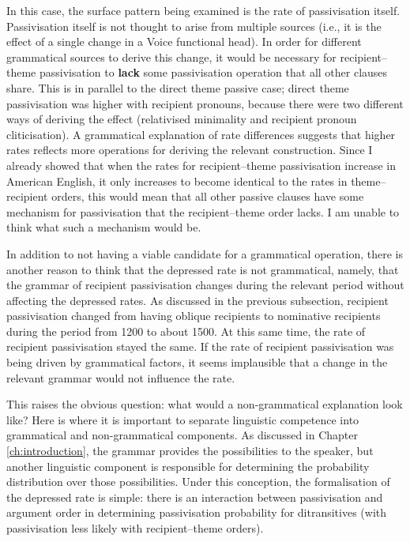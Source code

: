 	In this case, the surface pattern being examined is the rate of passivisation itself. Passivisation itself is not thought to arise from multiple sources (i.e., it is the effect of a single change in a Voice functional head). In order for different grammatical sources to derive this change, it would be necessary for recipient--theme passivisation to \textbf{lack} some passivisation operation that all other clauses share. This is in parallel to the direct theme passive case; direct theme passivisation was higher with recipient pronouns, because there were two different ways of deriving the effect (relativised minimality and recipient pronoun cliticisation). A grammatical explanation of rate differences suggests that higher rates reflects more operations for deriving the relevant construction. Since I already showed that when the rates for recipient--theme passivisation increase in American English, it only increases to become identical to the rates in theme--recipient orders, this would mean that all other passive clauses have some mechanism for passivisation that the recipient--theme order lacks. I am unable to think what such a mechanism would be.

	In addition to not having a viable candidate for a grammatical operation, there is another reason to think that the depressed rate is not grammatical, namely, that the grammar of recipient passivisation changes during the relevant period without affecting the depressed rates. As discussed in the previous subsection, recipient passivisation changed from having oblique recipients to nominative recipients during the period from 1200 to about 1500. At this same time, the rate of recipient passivisation stayed the same. If the rate of recipient passivisation was being driven by grammatical factors, it seems implausible that a change in the relevant grammar would not influence the rate.

	This raises the obvious question: what would a non-grammatical explanation look like? Here is where it is important to separate linguistic competence into grammatical and non-grammatical components. As discussed in Chapter \ref{ch:introduction}, the grammar provides the possibilities to the speaker, but another linguistic component is responsible for determining the probability distribution over those possibilities. Under this conception, the formalisation of the depressed rate is simple: there is an interaction between passivisation and argument order in determining passivisation probability for ditransitives (with passivisation less likely with recipient--theme orders). 

